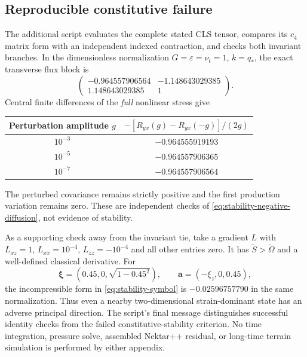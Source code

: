 \documentclass[11pt,a4paper]{article}
\numberwithin{equation}{section}
\newcommand{\eps}{\varepsilon}
\newcommand{\qs}{q_*}
\begin{document}
\subsection{Reproducible constitutive failure}
\label{sec:stability-numerical}
The additional script evaluates the complete stated CLS tensor,
compares its $c_4$ matrix form with an independent indexed contraction,
and checks both invariant branches. In the dimensionless normalization
$G=\eps=\nu_t=1$, $k=\qs$, the exact transverse flux block is
\begin{equation}
 \begin{pmatrix}
 -0.964557906564&-1.148643029385\\
  1.148643029385&1
 \end{pmatrix}.
 \label{eq:stability-test-block}
\end{equation}
Central finite differences of the \emph{full} nonlinear stress give
\begin{center}
\begin{tabular}{@{}cc@{}}
\toprule
Perturbation amplitude $g$ &
$-[R_{yx}(g)-R_{yx}(-g)]/(2g)$\\
\midrule
$10^{-3}$&$-0.964555919193$\\
$10^{-5}$&$-0.964557906365$\\
$10^{-7}$&$-0.964557906564$\\
\bottomrule
\end{tabular}
\end{center}
The perturbed covariance remains strictly positive and the first
production variation remains zero. These are independent checks of
\cref{eq:stability-negative-diffusion}, not evidence of stability.

As a supporting check away from the invariant tie, take a gradient
$L$ with $L_{xz}=1$, $L_{xx}=10^{-4}$, $L_{zz}=-10^{-4}$ and all
other entries zero. It has $\widetilde S>\widetilde\Omega$ and a
well-defined classical derivative. For
\begin{equation}
 \bm\xi=(0.45,0,\sqrt{1-0.45^2}),\qquad
 \bm a=(-\xi_z,0,0.45),
 \label{eq:stability-inplane-direction}
\end{equation}
the incompressible form in \cref{eq:stability-symbol} is
$-0.02596757790$ in the same normalization. Thus even a nearby
two-dimensional strain-dominant state has an adverse principal
direction. The script's final message distinguishes successful
identity checks from the failed constitutive-stability criterion.
No time integration, pressure solve, assembled Nektar++ residual,
or long-time terrain simulation is performed by either appendix.
\end{document}
